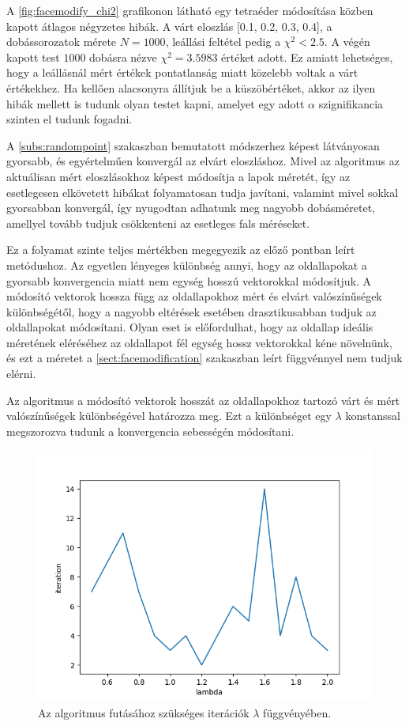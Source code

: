 A \ref{fig:facemodify_chi2} grafikonon látható egy tetraéder módosítása közben kapott átlagos négyzetes hibák.
A várt eloszlás [0.1, 0.2, 0.3, 0.4], a dobássorozatok mérete $N=1000$, leállási feltétel pedig a $\chi^2 < 2.5$.
A végén kapott test $1000$ dobásra nézve $\chi^2 = 3.5983$ értéket adott.
Ez amiatt lehetséges, hogy a leállásnál mért értékek pontatlanság miatt közelebb voltak a várt értékekhez.
Ha kellően alacsonyra állítjuk be a küszöbértéket, akkor az ilyen hibák mellett is tudunk olyan testet kapni, amelyet egy adott $\alpha$ szignifikancia szinten el tudunk fogadni.

A \ref{subs:randompoint} szakaszban bemutatott módszerhez képest látványosan gyorsabb, és egyértelműen konvergál az elvárt eloszláshoz.
Mivel az algoritmus az aktuálisan mért eloszlásokhoz képest módosítja a lapok méretét, így az esetlegesen elkövetett hibákat folyamatosan tudja javítani, valamint mivel sokkal gyorsabban konvergál, így nyugodtan adhatunk meg nagyobb dobásméretet, amellyel tovább tudjuk csökkenteni az esetleges fals méréseket.

\label{sect:ratiomodification}

Ez a folyamat szinte teljes mértékben megegyezik az előző pontban leírt metódushoz.
Az egyetlen lényeges különbség annyi, hogy az oldallapokat a gyorsabb konvergencia miatt nem egység hosszú vektorokkal módosítjuk.
A módosító vektorok hossza függ az oldallapokhoz mért és elvárt valószínűségek különbségétől, hogy a nagyobb eltérések esetében drasztikusabban tudjuk az oldallapokat módosítani.
Olyan eset is előfordulhat, hogy az oldallap ideális méretének eléréséhez az oldallapot fél egység hossz vektorokkal kéne növelnünk, és ezt a méretet a \ref{sect:facemodification} szakaszban leírt függvénnyel nem tudjuk elérni.

Az algoritmus a módosító vektorok hosszát az oldallapokhoz tartozó várt és mért valószínűségek különbségével határozza meg.
Ezt a különbséget egy $\lambda$ konstanssal megszorozva tudunk a konvergencia sebességén módosítani.
\begin{figure}[h!]
	\centering
	\includegraphics[scale=0.7]{images/lambdatest.png}
	\caption{Az algoritmus futásához szükséges iterációk $\lambda$ függvényében.}
	\label{fig:lambda}
\end{figure}

